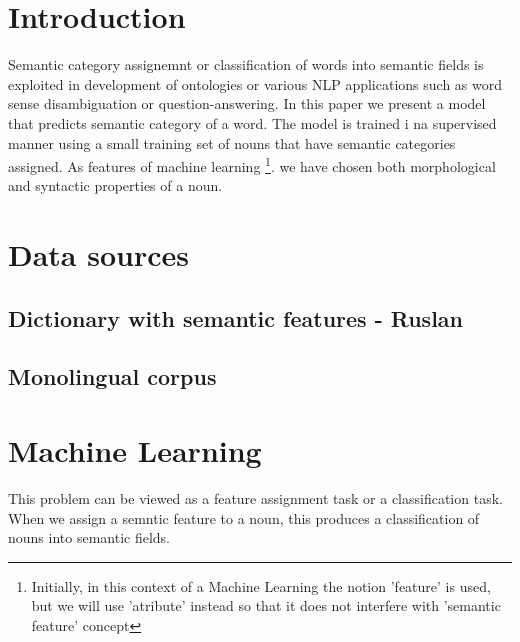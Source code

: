 \documentclass[letterpaper]{article}
\begin{document}
%
\title{}
\maketitle
\begin{abstract}
\begin{quote}
\end{quote}
\end{abstract}


\section{Introduction}
Semantic category assignemnt or classification of words into semantic fields 
is exploited in development of ontologies or various NLP applications such as 
word sense disambiguation or question-answering. In this paper we present a model that predicts 
semantic category of a word. The model is trained i na supervised manner
using a small training set of nouns that have semantic categories assigned. 
As features of machine learning \footnote{Initially, in this context of a Machine Learning the notion 'feature'
is used, but we will use 'atribute' instead so that it does not interfere with 'semantic feature' concept}.
we have chosen both morphological and syntactic properties of a noun.


\section{Data sources}

\subsection{Dictionary with semantic features - Ruslan}
\subsection{Monolingual corpus}


\section{Machine Learning}

This problem can be viewed as a feature assignment task or a 
classification task. %
When we assign a semntic feature to a noun, this produces a classification
of nouns into semantic fields.
\end{document}
